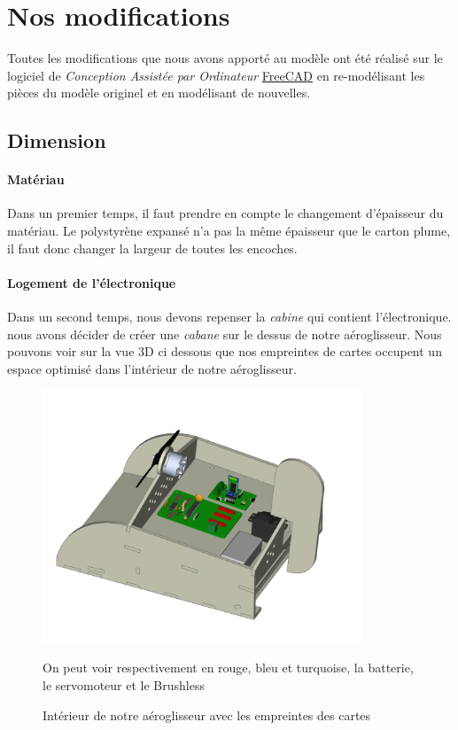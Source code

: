 		\section{Nos modifications}
		Toutes les modifications que nous avons apporté au modèle ont été réalisé sur le logiciel de \textit{Conception Assistée par Ordinateur} \href{https://freecadweb.org/}{FreeCAD} en re-modélisant les pièces du modèle originel et en modélisant de nouvelles.
			\subsection{Dimension}
				\paragraph{Matériau}Dans un premier temps, il faut prendre en compte le changement d'épaisseur du matériau. Le polystyrène expansé n'a pas la même épaisseur que le carton plume, il faut donc changer la largeur de toutes les encoches.
				\paragraph{Logement de l'électronique} Dans un second temps, nous devons repenser la \textit{cabine} qui contient l'électronique. nous avons décider de créer une \textit{cabane} sur le dessus de notre aéroglisseur. Nous pouvons voir sur la vue 3D ci dessous que nos empreintes de cartes occupent un espace optimisé dans l'intérieur de notre aéroglisseur.
				\begin{figure}[h]
					\begin{center}
						\includegraphics[width=0.85\textwidth]{../Illus/vueInterne.png}
					\end{center}
					\caption{Intérieur de notre aéroglisseur avec les empreintes des cartes}
					On peut voir respectivement en rouge, bleu et turquoise, la batterie, le servomoteur et le Brushless
					\label{MEPnous}
				\end{figure}
